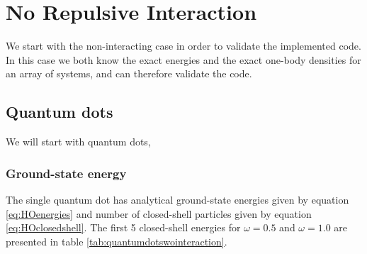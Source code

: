 \newpage
\section{No Repulsive Interaction}
We start with the non-interacting case in order to validate the implemented code. In this case we both know the exact energies and the exact one-body densities for an array of systems, and can therefore validate the code.

\subsection{Quantum dots}
We will start with quantum dots, 

\subsubsection{Ground-state energy}
The single quantum dot has analytical ground-state energies given by equation \eqref{eq:HOenergies} and number of closed-shell particles given by equation \eqref{eq:HOclosedshell}. The first 5 closed-shell energies for $\omega=0.5$ and $\omega=1.0$ are presented in table \eqref{tab:quantumdotswointeraction}.

